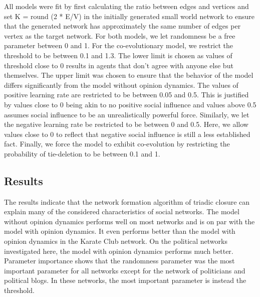 \documentclass{article}
\begin{document}
All models were fit by first calculating the ratio between edges and vertices and set K = round (2 * E/V) in the initially generated small world network to ensure that the generated network has approximately the same number of edges per vertex as the target network. 
For both models, we let randomness be a free parameter between 0 and 1. For the co-evolutionary model, we restrict the threshold to be between 0.1 and 1.3. The lower limit is chosen as values of threshold close to 0 results in agents that don’t agree with anyone else but themselves. The upper limit was chosen to ensure that the behavior of the model differs significantly from the model without opinion dynamics. 
The values of positive learning rate are restricted to be between 0.05 and 0.5. This is justified by values close to 0 being akin to no positive social influence and values above 0.5 assumes social influence to be an unrealistically powerful force. Similarly, we let the negative learning rate be restricted to be between 0 and 0.5. Here, we allow values close to 0 to reflect that negative social influence is still a less established fact. Finally, we force the model to exhibit co-evolution by restricting the probability of tie-deletion to be between 0.1 and 1. 

\subsection{Results}

The results indicate that the network formation algorithm of triadic closure can explain many of the considered characteristics of social networks. The model without opinion dynamics performs well on most networks and is on par with the model with opinion dynamics. It even performs better than the model with opinion dynamics in the Karate Club network. On the political networks investigated here, the model with opinion dynamics performs much better.
Parameter importance shows that the randomness parameter was the most important parameter for all networks except for the network of politicians and political blogs.  In these networks, the most important parameter is instead the threshold. 
\end{document}

